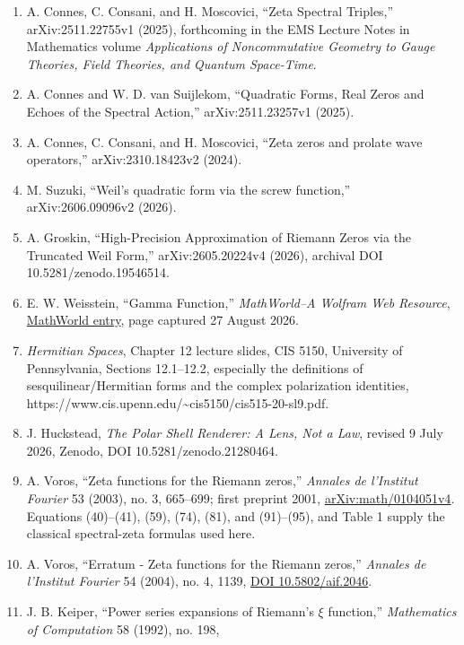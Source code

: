 \documentclass[
  11pt,
]{book}
\begin{document}
\begin{enumerate}
  (2026), archival DOI 10.5281/zenodo.21124802.
\item
  A. Connes, C. Consani, and H. Moscovici, ``Zeta Spectral Triples,''
  arXiv:2511.22755v1 (2025), forthcoming in the EMS Lecture Notes in
  Mathematics volume \emph{Applications of Noncommutative Geometry to
  Gauge Theories, Field Theories, and Quantum Space-Time}.
\item
  A. Connes and W. D. van Suijlekom, ``Quadratic Forms, Real Zeros and
  Echoes of the Spectral Action,'' arXiv:2511.23257v1 (2025).
\item
  A. Connes, C. Consani, and H. Moscovici, ``Zeta zeros and prolate wave
  operators,'' arXiv:2310.18423v2 (2024).
\item
  M. Suzuki, ``Weil's quadratic form via the screw function,''
  arXiv:2606.09096v2 (2026).
\item
  A. Groskin, ``High-Precision Approximation of Riemann Zeros via the
  Truncated Weil Form,'' arXiv:2605.20224v4 (2026), archival DOI
  10.5281/zenodo.19546514.
\item
  E. W. Weisstein, ``Gamma Function,'' \emph{MathWorld--A Wolfram Web
  Resource},
  \href{https://mathworld.wolfram.com/GammaFunction.html}{MathWorld
  entry}, page captured 27 August 2026.
\item
  \emph{Hermitian Spaces}, Chapter 12 lecture slides, CIS 5150,
  University of Pennsylvania, Sections 12.1--12.2, especially the
  definitions of sesquilinear/Hermitian forms and the complex
  polarization identities,
  https://www.cis.upenn.edu/\textasciitilde cis5150/cis515-20-sl9.pdf.
\item
  J. Huckstead, \emph{The Polar Shell Renderer: A Lens, Not a Law},
  revised 9 July 2026, Zenodo, DOI 10.5281/zenodo.21280464.
\item
  A. Voros, ``Zeta functions for the Riemann zeros,'' \emph{Annales de
  l'Institut Fourier} 53 (2003), no. 3, 665--699; first preprint 2001,
  \href{https://arxiv.org/abs/math/0104051v4}{arXiv:math/0104051v4}.
  Equations (40)--(41), (59), (74), (81), and (91)--(95), and Table 1
  supply the classical spectral-zeta formulas used here.
\item
  A. Voros, ``Erratum - Zeta functions for the Riemann zeros,''
  \emph{Annales de l'Institut Fourier} 54 (2004), no. 4, 1139,
  \href{https://aif.centre-mersenne.org/articles/10.5802/aif.2046/}{DOI
  10.5802/aif.2046}.
\item
  J. B. Keiper, ``Power series expansions of Riemann's \(\xi\)
  function,'' \emph{Mathematics of Computation} 58 (1992), no. 198,

\end{enumerate}
\end{document}
